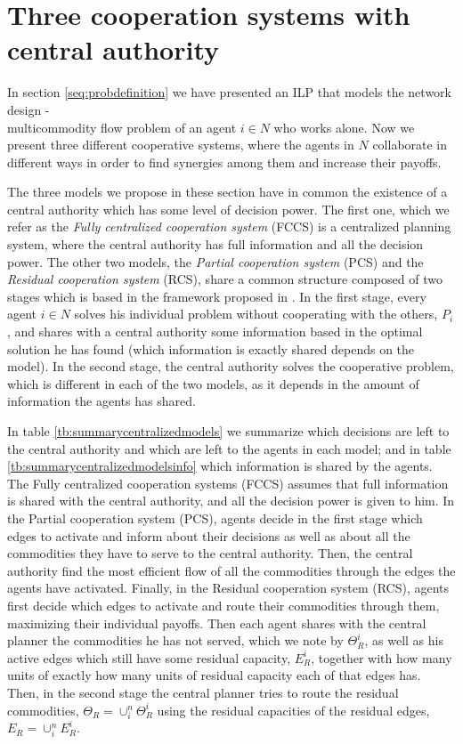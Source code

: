 \documentclass{article}
\begin{document}
\section{Three cooperation systems with central authority} \label{seq:centrmodels}

In section \ref{seq:probdefinition} we have presented an ILP that models the network design -\\ multicommodity flow problem of an agent $i\in N$ who works alone. Now we present three different cooperative systems, where the agents in $N$ collaborate in different ways in order to find synergies among them and increase their payoffs.

The three models we propose in these section have in common the existence of a central authority which has some level of decision power. The first one, which we refer as the \emph{Fully centralized cooperation system} (FCCS) is a centralized planning system, where the central authority has full information and all the decision power. The other two models, the \emph{Partial cooperation system} (PCS) and the \emph{Residual cooperation system} (RCS), share a common structure composed of two stages which is based in the framework proposed in \textcite{ANUPINDI2001}. In the first stage, every agent $i\in N$ solves his individual problem without cooperating with the others, $P_i$, and shares with a central authority some information based in the optimal solution he has found (which information is exactly shared depends on the model). In the second stage, the central authority solves the cooperative problem, which is different in each of the two models, as it depends in the amount of information the agents has shared.

In table \ref{tb:summarycentralizedmodels} we summarize which decisions are left to the central authority and which are left to the agents in each model; and in table \ref{tb:summarycentralizedmodelsinfo} which information is shared by the agents. The Fully centralized cooperation systems (FCCS) assumes that full information is shared with the central authority, and all the decision power is given to him. In the Partial cooperation system (PCS), agents decide in the first stage which edges to activate and inform about their decisions as well as about all the commodities they have to serve to the central authority. Then, the central authority find the most efficient flow of all the commodities through the edges the agents have activated. Finally, in the Residual cooperation system (RCS), agents first decide which edges to activate and route their commodities through them, maximizing their individual payoffs. Then each agent shares with the central planner the commodities he has not served, which we note by $\Theta_R^i$, as well as his active edges which still have some residual capacity, $E_R^i$, together with how many units of exactly how many units of residual capacity each of that edges has. Then, in the second stage the central planner tries to route the residual commodities, $\Theta_R = \cup_i^n \Theta_R^i$ using the residual capacities of the residual edges, $E_R = \cup_i^n E_R^i$.
\end{document}
